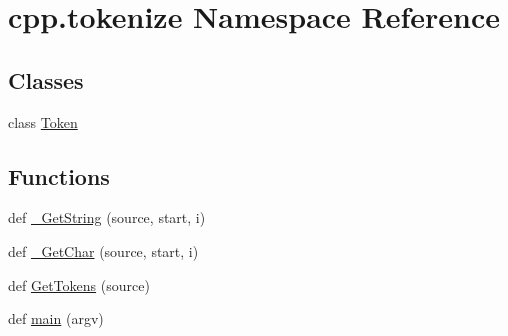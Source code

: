 \hypertarget{namespacecpp_1_1tokenize}{}\section{cpp.\+tokenize Namespace Reference}
\label{namespacecpp_1_1tokenize}
\subsection*{Classes}
\begin{DoxyCompactItemize}
\item 
class \hyperlink{classcpp_1_1tokenize_1_1Token}{Token}
\end{DoxyCompactItemize}
\subsection*{Functions}
\begin{DoxyCompactItemize}
\item 
def \hyperlink{namespacecpp_1_1tokenize_a3c6a8b154110b4b6a0385ccc3469db77}{\+\_\+\+Get\+String} (source, start, i)
\item 
def \hyperlink{namespacecpp_1_1tokenize_abeb75f493bd3035922daf150f5213ba9}{\+\_\+\+Get\+Char} (source, start, i)
\item 
def \hyperlink{namespacecpp_1_1tokenize_ab78959b4d0a9c3bade98904a23129afc}{Get\+Tokens} (source)
\item 
def \hyperlink{namespacecpp_1_1tokenize_ae666c331b4bd7d1f3e8956c78cc6f3a4}{main} (argv)
\end{DoxyCompactItemize}
